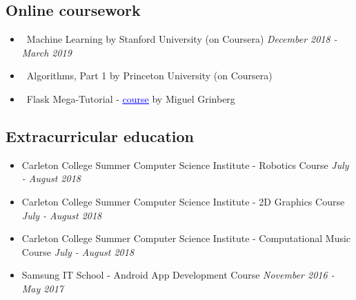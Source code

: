 \documentclass[letter,10pt]{extarticle}
\begin{document}
\subsection*{Online coursework}
\vspace{-0.5em}
\begin{itemize}
    \vspace{-0.3em}
    \item\ Machine Learning by Stanford University (on Coursera)
    \hfill\emph{December 2018 - March 2019}
    \vspace{-0.5em}
    \item\ Algorithms, Part 1 by Princeton University (on Coursera)
    \vspace{-0.5em}
    \item\ Flask Mega-Tutorial - \href{https://blog.miguelgrinberg.com/post/the-flask-mega-tutorial-part-i-hello-world}{\textcolor{blue}{\underline{course}}} by Miguel Grinberg
\end{itemize}
\vspace{-2em}
\subsection*{Extracurricular education}
\vspace{-0.5em}
\begin{itemize}
    \item Carleton College Summer Computer Science Institute - Robotics Course
    \hfill\emph{July - August 2018}
    \vspace{-0.5em}
    \item Carleton College Summer Computer Science Institute - 2D Graphics Course
    \hfill\emph{July - August 2018}
    \vspace{-0.5em}
    \item Carleton College Summer Computer Science Institute - Computational Music Course
    \hfill\emph{July - August 2018}
    \vspace{-0.5em}
    \item Samsung IT School - Android App Development Course
    \hfill \emph{November 2016 - May 2017}
\end{itemize}
\vspace{-2em}
\end{document}
